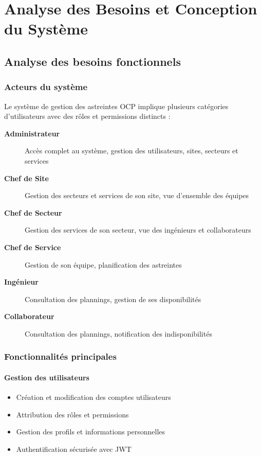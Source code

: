 \chapter{Analyse des Besoins et Conception du Système}

\section{Analyse des besoins fonctionnels}
\subsection{Acteurs du système}
Le système de gestion des astreintes OCP implique plusieurs catégories d'utilisateurs avec des rôles et permissions distincts :

\begin{description}
    \item[\textbf{Administrateur}] Accès complet au système, gestion des utilisateurs, sites, secteurs et services
    \item[\textbf{Chef de Site}] Gestion des secteurs et services de son site, vue d'ensemble des équipes
    \item[\textbf{Chef de Secteur}] Gestion des services de son secteur, vue des ingénieurs et collaborateurs
    \item[\textbf{Chef de Service}] Gestion de son équipe, planification des astreintes
    \item[\textbf{Ingénieur}] Consultation des plannings, gestion de ses disponibilités
    \item[\textbf{Collaborateur}] Consultation des plannings, notification des indisponibilités
\end{description}

\subsection{Fonctionnalités principales}
\subsubsection{Gestion des utilisateurs}
\begin{itemize}
    \item Création et modification des comptes utilisateurs
    \item Attribution des rôles et permissions
    \item Gestion des profils et informations personnelles
    \item Authentification sécurisée avec JWT
\end{itemize}

